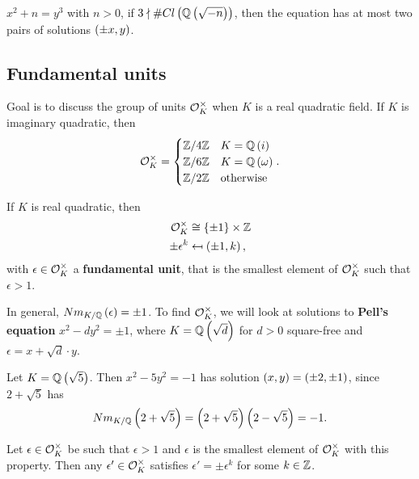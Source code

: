 \begin{remark*}
$ x^2 + n = y^3 $ with $ n > 0 $, if $ 3 \nmid \#Cl\left( \mathbb{Q}\left( \sqrt{-n} \right) \right) $, then the equation has at most two pairs of solutions $ \left( \pm x, y \right) $.
\end{remark*}

\pagebreak

\subsection{Fundamental units}


Goal is to discuss the group of units $ \mathcal{O}_K^\times $ when $ K $ is a real quadratic field. If $ K $ is imaginary quadratic, then
$$ \mathcal{O}_K^\times =
\begin{cases}
\mathbb{Z} / 4\mathbb{Z} & K = \mathbb{Q}\left( i \right) \\
\mathbb{Z} / 6\mathbb{Z} & K = \mathbb{Q}\left( \omega \right) \\
\mathbb{Z} / 2\mathbb{Z} & \text{otherwise}
\end{cases}.
$$

\begin{theorem}
If $ K $ is real quadratic, then
\begin{align*}
\mathcal{O}_K^\times & \cong \left\{ \pm 1 \right\} \times \mathbb{Z} \\
\pm\epsilon^k & \mapsfrom \left( \pm 1, k \right),
\end{align*}
with $ \epsilon \in \mathcal{O}_K^\times $ a \textbf{fundamental unit}, that is the smallest element of $ \mathcal{O}_K^\times $ such that $ \epsilon > 1 $.
\end{theorem}

In general, $ Nm_{K / \mathbb{Q}}\left( \epsilon \right) = \pm 1 $. To find $ \mathcal{O}_K^\times $, we will look at solutions to \textbf{Pell's equation} $ x^2 - dy^2 = \pm 1 $, where $ K = \mathbb{Q}\left( \sqrt{d} \right) $ for $ d > 0 $ square-free and $ \epsilon = x + \sqrt{d} \cdot y $.

\begin{example*}
Let $ K = \mathbb{Q}\left( \sqrt{5} \right) $. Then $ x^2 - 5y^2 = -1 $ has solution $ \left( x, y \right) = \left( \pm 2, \pm 1 \right) $, since $ 2 + \sqrt{5} $ has
$$ Nm_{K / \mathbb{Q}}\left( 2 + \sqrt{5} \right) = \left( 2 + \sqrt{5} \right)\left( 2 - \sqrt{5} \right) = -1. $$
\end{example*}

\begin{lemma}
Let $ \epsilon \in \mathcal{O}_K^\times $ be such that $ \epsilon > 1 $ and $ \epsilon $ is the smallest element of $ \mathcal{O}_K^\times $ with this property. Then any $ \epsilon' \in \mathcal{O}_K^\times $ satisfies $ \epsilon' = \pm\epsilon^k $ for some $ k \in \mathbb{Z} $.
\end{lemma}

